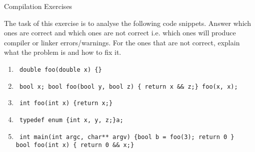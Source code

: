 \documentclass[12pt,a4paper]{scrartcl}
\begin{document}
\begin{aufgabe}[5]{Compilation Exercises}

	The task of this exercise is to analyse the following code snippets. Answer which ones are correct and which ones are not correct i.e. which ones will produce compiler or linker errors/warnings. For the ones that are not correct, explain what the problem is and how to fix it.

	\begin{enumerate}

		\item
		\begin{verbatim} double foo(double x) {}
		\end{verbatim}

		\item
		\begin{verbatim} bool x; bool foo(bool y, bool z) { return x && z;} foo(x, x);
		\end{verbatim}

		\item
		\begin{verbatim} int foo(int x) {return x;}
		\end{verbatim}

		\item
		\begin{verbatim} typedef enum {int x, y, z;}a;
		\end{verbatim}

		\item
		\begin{verbatim} int main(int argc, char** argv) {bool b = foo(3); return 0 }
bool foo(int x) { return 0 && x;}
		\end{verbatim}

	\end{enumerate}

\end{aufgabe}


\newpage
\end{document}
